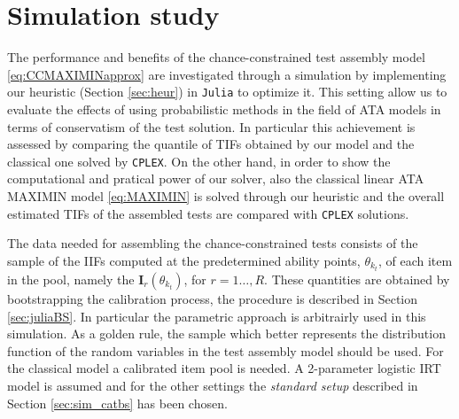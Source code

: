 \section{Simulation study}\label{sec:ccsim}

The performance and benefits of the chance-constrained test assembly model \eqref{eq:CCMAXIMINapprox} are investigated through a simulation by implementing our heuristic (Section \ref{sec:heur}) in \texttt{Julia} to optimize it. This setting allow us to evaluate the effects of using probabilistic methods in the field of ATA models in terms of conservatism of the test solution. In particular this achievement is assessed by comparing the quantile of TIFs obtained by our model and the classical one solved by \texttt{CPLEX}. On the other hand, in order to show the computational and pratical power of our solver, also the classical linear ATA MAXIMIN model \eqref{eq:MAXIMIN} is solved through our heuristic and the overall estimated TIFs of the assembled tests are compared with \texttt{CPLEX} solutions.

The data needed for assembling the chance-constrained tests consists of the sample of the IIFs computed at the predetermined ability points, $\theta_{k_t}$, of each item in the pool, namely the $\mathbf{I}_r(\theta_{k_t})$, for $r=1\ldots,R$. These quantities are obtained by bootstrapping the calibration process, the procedure is described in Section \ref{sec:juliaBS}. In particular the parametric approach is arbitrairly used in this simulation. As a golden rule, the sample which better represents the distribution function of the random variables in the test assembly model should be used. For the classical model a calibrated item pool is needed. A 2-parameter logistic IRT model is assumed and for the other settings the \emph{standard setup} described in Section \ref{sec:sim_catbs} has been chosen.

